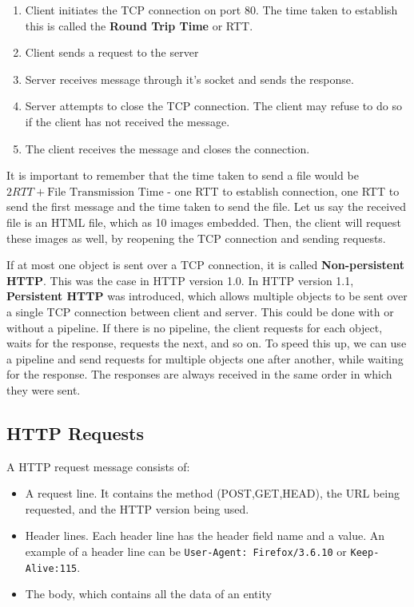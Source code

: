 \documentclass[12pt,letterpaper]{amsbook}
\theoremstyle{definition}
\begin{document}
\begin{enumerate}
  \item Client initiates the TCP connection on port 80. The time taken to establish this is called the \textbf{Round Trip Time} or RTT. 
  \item Client sends a request to the server
  \item Server receives message through it's socket and sends the response.
  \item Server attempts to close the TCP connection. The client may refuse to do so if the client has not received the message.
  \item The client receives the message and closes the connection.
\end{enumerate}

It is important to remember that the time taken to send a file would be $2RTT + \text{File Transmission Time}$ - one RTT to establish connection, one RTT to send the first message and the time taken to send the file. Let us say the received file is an HTML file, which as 10 images embedded. Then, the client will request these images as well, by reopening the TCP connection and sending requests.

If at most one object is sent over a TCP connection, it is called \textbf{Non-persistent HTTP}. This was the case in HTTP version 1.0. In HTTP version 1.1, \textbf{Persistent HTTP} was introduced, which allows multiple objects to be sent over a single TCP connection between client and server. This could be done with or without a pipeline. If there is no pipeline, the client requests for each object, waits for the response, requests the next, and so on. To speed this up, we can use a pipeline and send requests for multiple objects one after another, while waiting for the response. The responses are always received in the same order in which they were sent.

\subsection{HTTP Requests}

A HTTP request message consists of:

\begin{itemize}
  \item A request line. It contains the method (POST,GET,HEAD), the URL being requested, and the HTTP version being used.
  \item Header lines. Each header line has the header field name and a value. An example of a header line can be \texttt{User-Agent: Firefox/3.6.10} or \texttt{Keep-Alive:115}.
  \item The body, which contains all the data of an entity
\end{itemize}
\end{document}
